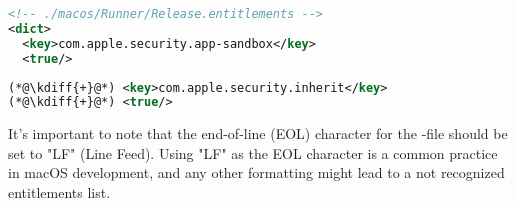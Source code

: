 \begin{lstlisting}[language=xml]
<!-- ./macos/Runner/Release.entitlements -->
<dict>
  <key>com.apple.security.app-sandbox</key>
  <true/>
\end{lstlisting}
{
\xpretocmd{\lstlisting}{\vspace{-14pt}}{}{}
\begin{lstlisting}[firstnumber=5, language=xml, backgroundcolor=\color{backgreen}]
(*@\kdiff{+}@*) <key>com.apple.security.inherit</key>
(*@\kdiff{+}@*) <true/>
\end{lstlisting}
}

\noindent It's important to note that the end-of-line (EOL) character for the -file 
should be set to "LF" (Line Feed). Using "LF" as the EOL character is a common practice in macOS development, and 
any other formatting might lead to a not recognized entitlements list.
